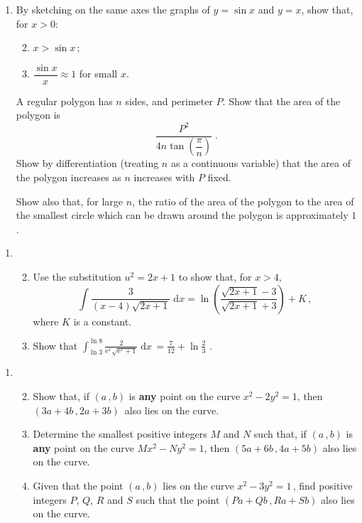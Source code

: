 \documentclass[a4, 11pt]{report}
\newlength{\qspace}
\newcounter{qnumber}
\newenvironment{question}%
 {\vspace{\qspace}
  \begin{enumerate}[\bfseries 1\quad][10]%
    \setcounter{enumi}{\value{qnumber}}%
    \item%
 }
{
  \end{enumerate}
  \filbreak
  \stepcounter{qnumber}
 }
\newenvironment{questionparts}[1][1]%
 {
  \begin{enumerate}[\bfseries (i)]%
    \setcounter{enumii}{#1}
    \addtocounter{enumii}{-1}
    \setlength{\itemsep}{5mm}
    \setlength{\parskip}{8pt}
 }
 {
  \end{enumerate}
 }
\def\d{{\mathrm d}}
\def\e{{\mathrm e}}
\def\l{\left(}
\def\r{\right)}
\begin{document}
\begin{question}
By sketching  on the same axes the graphs of  $y=\sin x$ and
$y=x$, show that, for $x>0$:
\begin{questionparts}
\item $x>\sin x\,$;
\item $\dfrac {\sin x} {x} \approx 1$ for small $x$. 
\end{questionparts}

A regular polygon has $n$ sides, and perimeter $P$. 
Show that the area of the polygon is
\[
\displaystyle \frac{P^2} { {4n \tan \l\dfrac{ \pi} { n} \r}} \;.
\]
Show by differentiation (treating $n$ as a continuous variable)
  that the area of the polygon 
increases as $n$ increases with $P$ fixed.

 Show also that, for large $n$, the ratio of the 
area of the polygon to the 
area of the smallest circle which can be drawn around the polygon is approximately $1$.
\end{question}

\begin{question}
\begin{questionparts}
\item
Use the substitution $u^2=2x+1$ to show that, for $x>4$, 
\[
\int \frac{3} { ( x-4 ) \sqrt {2x+1}} \; 
\d x = \ln \l \frac{\sqrt{2x+1}-3} {\sqrt{2x+1}+3} \r + K\,,
\]
where $K$ is a constant.

 
\item Show that  $ \displaystyle \int_{\ln 3}^{\ln 8}
 \frac{2} { \e^x \sqrt{ \e^x + 1}}\; \mathrm{d}x\, = 
 \frac 7{12} + \ln \frac23 $
.

\end{questionparts}
	\end{question}
	
\begin{question}
\begin{questionparts}
\item Show that, if $\l a \, , b\r$  is {\bf any} point on the 
curve $x^2 - 2y^2 = 1$, 
then $\l 3a + 4b \, , 2a + 3b \r\,$ also lies on the curve.

\item Determine the smallest positive integers
$M$ and $N$ such that, if $\l a \,,  b\r$ is {\bf any} point on the curve
$Mx^2 - Ny^2 = 1$, then $(5a+6b\,, 4a+5b)$ also lies on the curve.

\item Given that the point $\l a \, , b\r$ lies on 
the curve $x^2 - 3y^2 = 1\,$, 
find positive integers $P$, $Q$, $R$ and $S$ such that
the point  $(P a +Q b\,, R a + Sb)$ also lies on the  curve.


\end{questionparts}
\end{question}
	
\end{document}
